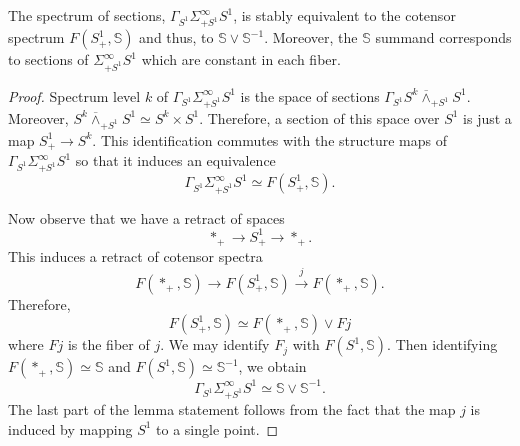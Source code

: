 \documentclass[10pt,a4paper]{amsart}
\newcommand{\Sph}{\mathbb{S}}
\begin{document}
\begin{lem}\label{lem:split section}
The spectrum of sections, $\Gamma_{S^1}\Sigma_{+S^1}^\infty S^1$, is stably equivalent to the cotensor spectrum $F(S^1_+,\Sph)$ and thus, to $\Sph\vee  \Sph^{-1}$. Moreover, the $\Sph$ summand corresponds to sections of $\Sigma_{+S^1}^\infty S^1$ which are constant in each fiber.
\end{lem}

\begin{proof}
Spectrum level $k$ of $\Gamma_{S^1}\Sigma_{+S^1}^\infty S^1$ is the space of sections $\Gamma_{S^1}S^k\overline{\wedge}_{+S^1}S^1$. Moreover, $S^k\overline{\wedge}_{+S^1}S^1 \simeq S^k\times S^1$. Therefore, a section of this space over $S^1$ is just a map $S^1_+\to S^k$. This identification commutes with the structure maps of $\Gamma_{S^1} \Sigma_{+S^1}^\infty S^1$ so that it induces an equivalence 
\[
\Gamma_{S^1}\Sigma_{+S^1}^\infty S^1 \simeq F(S^1_+,\Sph).
\]

Now observe that we have a retract of spaces 
\[
*_+ \to S^1_+ \to *_+.
\]
This induces a retract of cotensor spectra
\[
F(*_+,\Sph) \to F(S^1_+,\Sph) \xrightarrow{j} F(*_+,\Sph).
\]
Therefore, 
\[
F(S^1_+,\Sph)\simeq F(*_+,\Sph)\vee Fj
\]
where $Fj$ is the fiber of $j$. We may identify $F_j$ with $F(S^1,\Sph)$. Then identifying $F(*_+,\Sph)\simeq \Sph$ and $F(S^1,\Sph)\simeq \Sph^{-1}$, we obtain
\[
\Gamma_{S^1} \Sigma_{+S^1}^\infty S^1\simeq \Sph\vee \Sph^{-1}.
\]
The last part of the lemma statement follows from the fact that the map $j$ is induced by mapping $S^1$ to a single point. 
\end{proof}
\end{document}
